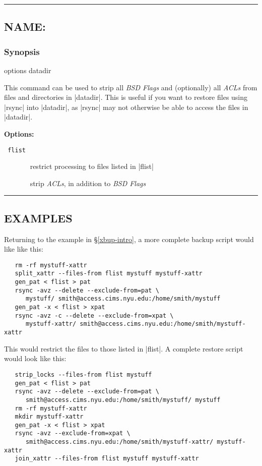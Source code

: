 \documentclass[11pt]{article}
\def\sepline{\begin{center}\rule{5in}{1pt}\end{center}}
\newcommand\BackSlash{\char92}
\newcommand\LeftBrace{\char123}
\newcommand\RightBrace{\char125}
\newenvironment{Quote}{\let\\\BackSlash\let\{\LeftBrace\let\}\RightBrace}{}
\begin{document}
\sepline


\subsection*{NAME: \tt{}}

\subsubsection*{Synopsis}

\begin{Quote}
\begin{Vrb}
    options datadir
\end{Vrb}
\end{Quote}

This command can be used to strip all \emph{BSD Flags}
and (optionally) all \emph{ACLs} from files and directories
in |datadir|.
This is useful if you want to restore files using |rsync|
into |datadir|, as |rsync| may not otherwise be able to 
access the files in |datadir|.

\medbreak
{\bf Options:}


\begin{description}
\item[{\tt{} flist}] \ \\
restrict processing to files listed in |flist|

\item[{\tt{}}] \ \\
strip \emph{ACLs}, in addition to \emph{BSD Flags}
\end{description}


\sepline 

\subsection*{EXAMPLES}

Returning to the example in \S\ref{xbup-intro},
a more complete backup script would like like this:
\begin{Verbatim}
   rm -rf mystuff-xattr
   split_xattr --files-from flist mystuff mystuff-xattr
   gen_pat < flist > pat
   rsync -avz --delete --exclude-from=pat \
      mystuff/ smith@access.cims.nyu.edu:/home/smith/mystuff
   gen_pat -x < flist > xpat
   rsync -avz -c --delete --exclude-from=xpat \
      mystuff-xattr/ smith@access.cims.nyu.edu:/home/smith/mystuff-xattr
\end{Verbatim}
This would restrict the files to those listed in |flist|.
A complete restore script would look like this:
\begin{Verbatim}
   strip_locks --files-from flist mystuff
   gen_pat < flist > pat
   rsync -avz --delete --exclude-from=pat \
      smith@access.cims.nyu.edu:/home/smith/mystuff/ mystuff
   rm -rf mystuff-xattr
   mkdir mystuff-xattr
   gen_pat -x < flist > xpat
   rsync -avz --exclude-from=xpat \
      smith@access.cims.nyu.edu:/home/smith/mystuff-xattr/ mystuff-xattr
   join_xattr --files-from flist mystuff mystuff-xattr
\end{Verbatim}
\end{document}
